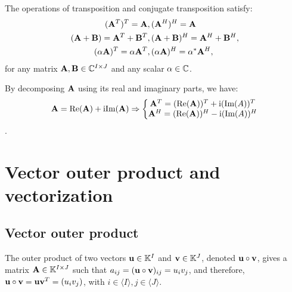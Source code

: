 \begin{proposition}{}{}
    The operations of transposition and conjugate transposition satisfy:
    \begin{align*}
        (\bold{A}^T)^T=\bold{A}&, (\bold{A}^H)^H=\bold{A}\\
        (\bold{A}+\bold{B})=\bold{A}^T+\bold{B}^T&, (\bold{A}+\bold{B})^{H}=\bold{A}^H+\bold{B}^H,\\
        (\alpha \bold{A})^T=\alpha \bold{A}^T&, (\alpha \bold{A})^H=\alpha^*\bold{A}^H, 
    \end{align*}
    for any matrix $\bold{A},\bold{B}\in\mathbb{C}^{I\times J}$ and any scalar $\alpha\in\mathbb{C}$.
\end{proposition}

\begin{remark}
    By decomposing $\bold{A}$ using its real and imaginary parts, we have:
    \begin{align*}
        \bold{A}=\text{Re}(\bold{A}) +\text{i} \text{Im} (\bold{A}) \Rightarrow 
        \left\{\begin{matrix}
           \bold{A}^T = (\text{Re}(\bold{A}))^T+\text{i} (\text{Im}(A))^T \\
           \bold{A}^H = (\text{Re}(\bold{A}))^H-\text{i} (\text{Im}(A))^H
          \end{matrix}\right.
    \end{align*}.
\end{remark}

\section{Vector outer product and vectorization}
\subsection{Vector outer product}
The outer product of two vectors $\bold{u}\in\mathbb{K}^{I}$ and $\bold{v}\in \mathbb{K}^{J}$,
denoted $\bold{u}\circ \bold{v}$,
gives a matrix $\bold{A}\in \mathbb{K}^{I\times J}$
such that $a_{ij}=(\bold{u}\circ\bold{v})_{ij}=u_iv_j$,
and therefore, $\bold{u}\circ\bold{v}=\bold{u}\bold{v}^T=(u_iv_j)$, 
with $i\in \langle I\rangle,j\in\langle J\rangle$.

